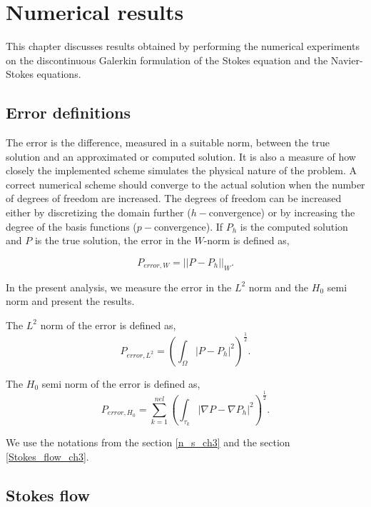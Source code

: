 \documentclass[a4paper,twoside,openright]{book}
\begin{document}
\chapter{Numerical results}

This chapter discusses results obtained by performing the numerical experiments on the discontinuous Galerkin formulation of the Stokes equation and the Navier-Stokes equations.

\section{Error definitions}

The error is the difference, measured in a suitable norm, between the true solution and an approximated or computed solution. It is also a measure of how closely the implemented scheme simulates the physical nature of the problem. A correct numerical scheme should converge to the actual solution when the number of degrees of freedom are increased. The degrees of freedom can be increased either by discretizing the domain further ($h-$convergence) or by increasing the degree of the basis functions ($p-$convergence). If $P_h$ is the computed solution and $P$ is the true solution, the error in the $W$-norm is defined as,

\begin{equation} \label{error_definition}
P_{error,W} = ||P - P_h||_{W} \mathrm{.}
\end{equation}

In the present analysis, we measure the error in the $L^2$ norm and the $H_0$ semi norm and present the results.

The $L^2$ norm of the error is defined as,
\begin{equation}
P_{error,L^2} = (\int_{\Omega} |P - P_h|^2 )^\frac{1}{2} \mathrm{.}
\end{equation}

The $H_0$ semi norm of the error is defined as,\begin{equation}
P_{error,H_0} = \sum_{k=1}^{nel} (\int_{\tau_k} |\nabla P - \nabla P_h|^2)^\frac{1}{2} \mathrm{.}
\end{equation}

We use the notations from the section \ref{n_s_ch3} and the section \ref{Stokes_flow_ch3}.

\section{Stokes flow}\label{Stokes-ch5}
\end{document}
